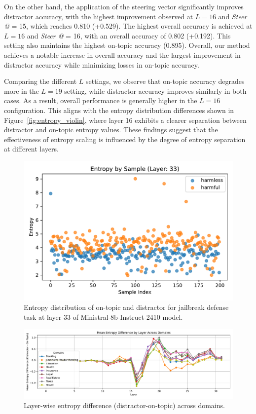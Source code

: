 \documentclass[11pt]{article}
\begin{document}
On the other hand, the application of the steering vector significantly improves distractor accuracy, with the highest improvement observed at \( L = 16 \) and \textit{Steer @} = 15, which reaches 0.810 (+0.529). The highest overall accuracy is achieved at \( L=16 \) and \textit{Steer @} = 16, with an overall accuracy of 0.802 (+0.192). This setting also maintains the highest on-topic accuracy (0.895). Overall, our method achieves a notable increase in overall accuracy and the largest improvement in distractor accuracy while minimizing losses in on-topic accuracy.



Comparing the different \( L\) settings, we observe that on-topic accuracy degrades more in the \( L = 19 \) setting, while distractor accuracy improves similarly in both cases. As a result, overall performance is generally higher in the \( L = 16 \) configuration. This aligns with the entropy distribution differences shown in Figure~\ref{fig:entropy_violin}, where layer 16 exhibits a clearer separation between distractor and on-topic entropy values. These findings suggest that the effectiveness of entropy scaling is influenced by the degree of entropy separation at different layers.


\begin{figure}[t]
\centering
  \includegraphics[width=\columnwidth]{latex/figures/sample_entropy_33.pdf}
  \caption{Entropy distribution of on-topic and distractor for jailbreak defense task at layer 33 of Ministral-8b-Instruct-2410 model.}
  \label{fig:entropy_jailbreak}
\end{figure}

\begin{figure}[t]
\centering
  \includegraphics[width=2\columnwidth]{latex/figures/layer_entropy_mean_diff_k_2.pdf}
  \caption{Layer-wise entropy difference (distractor-on-topic) across domains.}
  \label{fig:mean_domain_layer}
\end{figure}
\end{document}
